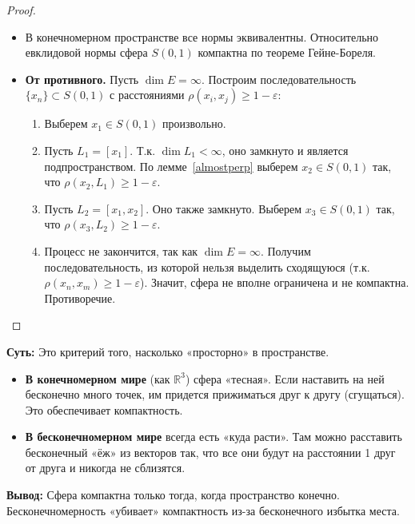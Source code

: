 \begin{proof}
	\begin{itemize}
		\item[$\Leftarrow$] В конечномерном пространстве все нормы эквивалентны. Относительно евклидовой нормы сфера $S(0, 1)$ компактна по теореме Гейне-Бореля.
		
		\item[$\Rightarrow$] \textbf{От противного.} Пусть $\dim E = \infty$. Построим последовательность $\{x_n\} \subset S(0, 1)$ с расстояниями $\rho(x_i, x_j) \geqslant 1 - \varepsilon$:
		\begin{enumerate}
			\item Выберем $x_1 \in S(0, 1)$ произвольно.
			\item Пусть $L_1 = [x_1]$. Т.к. $\dim L_1 < \infty$, оно замкнуто и является подпространством. По лемме~\ref{almostperp} выберем $x_2 \in S(0, 1)$ так, что $\rho(x_2, L_1) \geqslant 1 - \varepsilon$.
			\item Пусть $L_2 = [x_1, x_2]$. Оно также замкнуто. Выберем $x_3 \in S(0, 1)$ так, что $\rho(x_3, L_2) \geqslant 1 - \varepsilon$.
			\item Процесс не закончится, так как $\dim E = \infty$. Получим последовательность, из которой нельзя выделить сходящуюся (т.к. $\rho(x_n, x_m) \geqslant 1-\varepsilon$). Значит, сфера не вполне ограничена и не компактна. Противоречие.
		\end{enumerate}
	\end{itemize}
\end{proof}	

\begin{idea}
	\textbf{Суть:} Это критерий того, насколько «просторно» в пространстве. 
	
	\begin{itemize}
		\item \textbf{В конечномерном мире} (как $\mathbb{R}^3$) сфера «тесная». Если наставить на ней бесконечно много точек, им придется прижиматься друг к другу (сгущаться). Это обеспечивает компактность.
		\item \textbf{В бесконечномерном мире} всегда есть «куда расти». Там можно расставить бесконечный «ёж» из векторов так, что все они будут на расстоянии 1 друг от друга и никогда не сблизятся. 
	\end{itemize}
	\textbf{Вывод:} Сфера компактна только тогда, когда пространство конечно. Бесконечномерность «убивает» компактность из-за бесконечного избытка места.
\end{idea}

